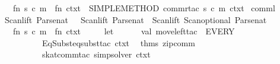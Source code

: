 \begin{isabellebody}
\ \ {}fn\ {}{}s{}\ c{}{}\ m{}\ {}{}\ fn\ ctxt\ {}{}\ SIMPLE{}METHOD{}\ {}commr{}tac\ s\ c\ m\ ctxt{}{}\isanewline
{}\isanewline
\isanewline
{}\isamarkupfalse%
\ comml{}\ {}\ {}\isanewline
Scan{}lift\ Parse{}nat\ \ {}{}\ Scan{}lift\ Parse{}nat\ {}{}\ Scan{}lift\ {}Scan{}optional\ Parse{}nat\ {}{}\ {}{}\isanewline
\ \ {}fn\ {}{}s{}\ c{}{}\ m{}\ {}{}\ fn\ ctxt\ {}{}\isanewline
\ \ \ \ let\isanewline
\ \ \ \ \ \ val\ move{}left{}tac\ {}\ EVERY\isanewline
\ \ \ \ \ \ \ \ {}\ EqSubst{}eqsubst{}tac\ ctxt\ {}{}{}\ %
\isaantiq
thms\ zip{}comm{}%
\endisaantiq
\ {}\isanewline
\ \ \ \ \ \ \ \ {}\ skat{}comm{}tac\ simp{}solver\ ctxt\ {}\isanewline

\end{isabellebody}
